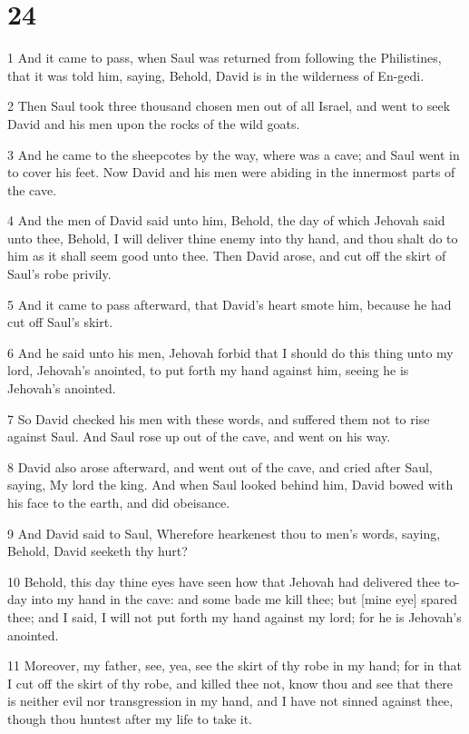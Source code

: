 \chapter{24}

\par 1 And it came to pass, when Saul was returned from following the Philistines, that it was told him, saying, Behold, David is in the wilderness of En-gedi.
\par 2 Then Saul took three thousand chosen men out of all Israel, and went to seek David and his men upon the rocks of the wild goats.
\par 3 And he came to the sheepcotes by the way, where was a cave; and Saul went in to cover his feet. Now David and his men were abiding in the innermost parts of the cave.
\par 4 And the men of David said unto him, Behold, the day of which Jehovah said unto thee, Behold, I will deliver thine enemy into thy hand, and thou shalt do to him as it shall seem good unto thee. Then David arose, and cut off the skirt of Saul's robe privily.
\par 5 And it came to pass afterward, that David's heart smote him, because he had cut off Saul's skirt.
\par 6 And he said unto his men, Jehovah forbid that I should do this thing unto my lord, Jehovah's anointed, to put forth my hand against him, seeing he is Jehovah's anointed.
\par 7 So David checked his men with these words, and suffered them not to rise against Saul. And Saul rose up out of the cave, and went on his way.
\par 8 David also arose afterward, and went out of the cave, and cried after Saul, saying, My lord the king. And when Saul looked behind him, David bowed with his face to the earth, and did obeisance.
\par 9 And David said to Saul, Wherefore hearkenest thou to men's words, saying, Behold, David seeketh thy hurt?
\par 10 Behold, this day thine eyes have seen how that Jehovah had delivered thee to-day into my hand in the cave: and some bade me kill thee; but [mine eye] spared thee; and I said, I will not put forth my hand against my lord; for he is Jehovah's anointed.
\par 11 Moreover, my father, see, yea, see the skirt of thy robe in my hand; for in that I cut off the skirt of thy robe, and killed thee not, know thou and see that there is neither evil nor transgression in my hand, and I have not sinned against thee, though thou huntest after my life to take it.
